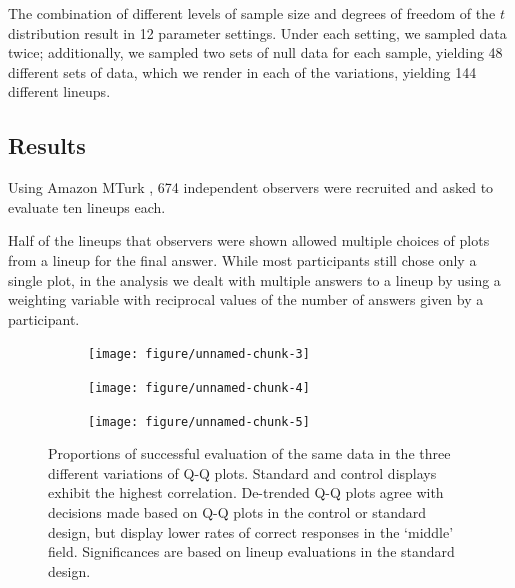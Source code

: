\documentclass{article}\usepackage[]{graphicx}\usepackage[]{color}
\newenvironment{knitrout}{}{} %
\newcommand{\hh}[1]{{\color{magenta} #1}}
\begin{document}
%
The combination of different levels of sample size and degrees of freedom of the $t$ distribution result in 12 parameter settings. Under each setting, we sampled data twice; additionally, we sampled two sets of null data for each sample, yielding 48 different sets of data, which we render in each of the variations, yielding 144 different lineups. 

\subsection{Results}

Using  Amazon MTurk \citep{amazon}, 674 independent observers were recruited and asked to evaluate ten lineups each. 

\hh{Half of the lineups that observers were shown allowed multiple choices of plots from a lineup for the final answer. While most participants still chose only a single plot, in the analysis} 
\hh{we dealt with multiple answers to a lineup by using a weighting variable with reciprocal values of the number of answers given by a participant.}








\begin{figure}
\centering
\begin{subfigure}[b]{.3\textwidth}
\begin{knitrout}
\color{fgcolor}
\texttt{[image: figure/unnamed-chunk-3]} 

\end{knitrout}

\end{subfigure}
\begin{subfigure}[b]{.3\textwidth}
\begin{knitrout}
\color{fgcolor}
\texttt{[image: figure/unnamed-chunk-4]} 

\end{knitrout}

\end{subfigure}
\begin{subfigure}[b]{.3\textwidth}
\begin{knitrout}
\color{fgcolor}
\texttt{[image: figure/unnamed-chunk-5]} 

\end{knitrout}

\end{subfigure}
\caption{\label{fig:compare}Proportions of successful evaluation of the same data in the three different variations of Q-Q plots. Standard and control displays exhibit the highest correlation. De-trended Q-Q plots agree with decisions made based on Q-Q plots in the control or standard design, but display lower rates of correct responses in the `middle' field. Significances are based on lineup evaluations in the standard design. }
\end{figure}
\end{document}
